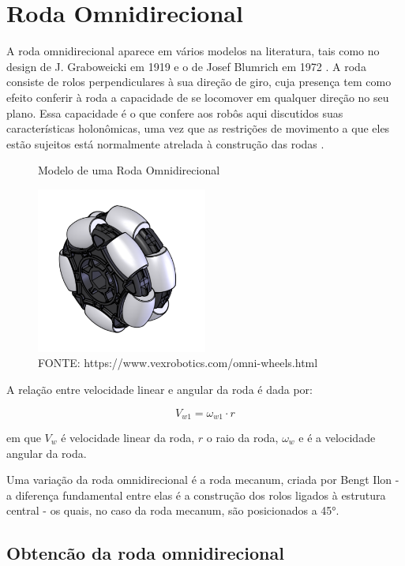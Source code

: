 
\section{Roda Omnidirecional}

A roda omnidirecional aparece em vários modelos na literatura, tais como no design de J. Graboweicki em 1919
\cite{patent_US1305535A} e o de Josef Blumrich em 1972 \cite{patent_US3789947A}. A roda consiste de rolos
perpendiculares à  sua direção de giro, cuja presença tem como efeito conferir à roda a capacidade de se locomover em
qualquer direção no seu plano. Essa capacidade é o que confere aos robôs aqui discutidos suas características
holonômicas, uma vez que as restrições de movimento a que eles estão sujeitos está normalmente atrelada à construção das
rodas \cite{TAKAHASHI}.

\begin{figure}[h] 
	\centering
	\caption{Modelo de uma Roda Omnidirecional}
	\includegraphics[width=0.5\textwidth]{figures/omniwheel}
    \caption*{FONTE: https://www.vexrobotics.com/omni-wheels.html}
\end{figure}

A relação entre velocidade linear e angular da roda é dada por:

\[V_{w1} = \omega_{w1}\cdot r \] 

em que $V_{w}$ é velocidade linear da roda, $r$ o raio da roda, $\omega_{w} $ e é a velocidade angular da roda.

Uma variação da roda omnidirecional é a roda mecanum, criada por Bengt Ilon \cite{patent_US3876255A} - a diferença
fundamental entre elas é a construção dos rolos ligados à estrutura central - os quais, no caso da roda mecanum, são
posicionados a 45°.

\subsection{Obtencão da roda omnidirecional}

